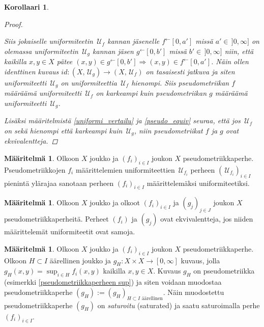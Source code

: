 \documentclass[12pt,a4paper,leqno]{report}
\newcommand{\R}{\mathbb{R}}
\newcommand{\U}{\,\mathcal{U}}
\theoremstyle{plain}
\newtheorem{kor}[equation]{Korollaari}
\theoremstyle{definition}
\newtheorem{maar}[equation]{Määritelmä}
\newtheorem{esim}[equation]{Esimerkki}
\theoremstyle{remark}
\begin{document}
\begin{kor}
\begin{proof}
\begin{enumerate}
Siis jokaiselle uniformiteetin $\U_f$ kannan jäsenelle 
$f^{\leftarrow}[0,a']$ missä $a'\in\,]0,\infty] $ on olemassa uniformiteetin $\U_g$ 
kannan jäsen $g^{\leftarrow}[0,b']$ missä $b'\in\,]0,\infty]$ niin, 
että kaikilla $x,y\in X$ pätee $(x,y)\in g^{\leftarrow}[0,b']\Rightarrow (x,y)\in f^{\leftarrow}[0,a']$. 
Näin ollen identtinen kuvaus $id\colon (X,\U_g)\rightarrow (X,\U_f)$ on 
tasaisesti jatkuva ja siten uniformiteetti $\U_g$ on uniformiteettia $\U_f$ hienompi. 
Siis pseudometriikan $f$ määräämä uniformiteetti 
$\U_f$ 
on karkeampi kuin pseudometriikan $g$ määräämä uniformiteetti $\U_g$.
\end{enumerate}
Lisäksi 
määritelmistä \ref{uniformi_vertailu} ja \ref{pseudo_equiv} seuraa, että jos $\U_f$ on sekä hienompi että karkeampi kuin $\U_g$, niin pseudometriikat $f$ ja $g$ ovat ekvivalentteja.
\end{proof}
\end{kor}
\begin{maar}
Olkoon $X$ joukko ja $(f_i)_{i\in I} $ joukon $X$ pseudometriikkaperhe. 
Pseudometriikkojen $f_i$ määrittelemien uniformiteettien $\U_{f_i}$ perheen $(\U_{f_i})_{i\in I}$ pienintä ylärajaa 
sanotaan perheen $(f_i)_{i\in I}$ määrittelemäksi uniformiteetiksi. 
\end{maar}
\begin{maar}
Olkoon $X$ joukko ja olkoot $(f_i)_{i\in I} $ ja $(g_j)_{j\in J} $ joukon $X$ pseudometriikkaperheitä. 
Perheet $(f_i)$ ja $(g_j) $ ovat ekvivalentteja, jos niiden määrittelemät uniformiteetit ovat samoja.
\end{maar}
\begin{maar}\label{saturoitu maar}
Olkoon $X$ joukko
ja $(f_i)_{i\in I} $ joukon $X$ pseudometriikkaperhe. 
Olkoon $H\subset I$ äärellinen joukko ja $g_{H}\colon X\times X\rightarrow [0,\infty]$ kuvaus, 
jolla $g_{H}(x,y)=\sup_{i\in H}f_i(x,y)$ kaikilla $x,y\in X$. 
Kuvaus $g_{H}$ on pseudometriikka 
(esimerkki \ref{pseudometriikkaperheen sup}) 
ja siten voidaan muodostaa pseudometriikkaperhe 
$(g_{H}):=(g_{H})_{H\subset I \text{ äärellinen}}$. 
Näin 
muodostettu pseudometriikkaperhe $(g_H)$ on
 \emph{saturoitu} (saturated) ja 
saatu saturoimalla perhe $(f_i)_{i\in I}$. 
\end{maar}
\end{document}

